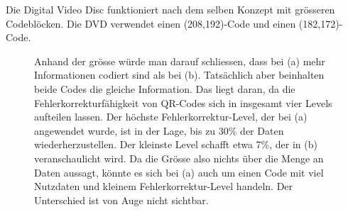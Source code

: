 Die Digital Video Disc funktioniert nach dem selben Konzept mit grösseren Codeblöcken. Die DVD verwendet einen (208,192)-Code und einen (182,172)-Code.


\begin{figure}
	\centering
	\caption{Anhand der grösse würde man darauf schliessen, dass bei (a) mehr Informationen codiert sind als bei (b). Tatsächlich aber beinhalten beide Codes die gleiche Information. Das liegt daran, da die Fehlerkorrekturfähigkeit von QR-Codes sich in insgesamt vier Levels aufteilen lassen. Der höchste Fehlerkorrektur-Level, der bei (a) angewendet wurde, ist in der Lage, bis zu 30\% der Daten wiederherzustellen. Der kleinste Level schafft etwa 7\%, der in (b) veranschaulicht wird. Da die Grösse also nichts über die Menge an Daten aussagt, könnte es sich bei (a) auch um einen Code mit viel Nutzdaten und kleinem Fehlerkorrektur-Level handeln. Der Unterschied ist von Auge nicht sichtbar.}
	\label{fig:qr}
\end{figure}

